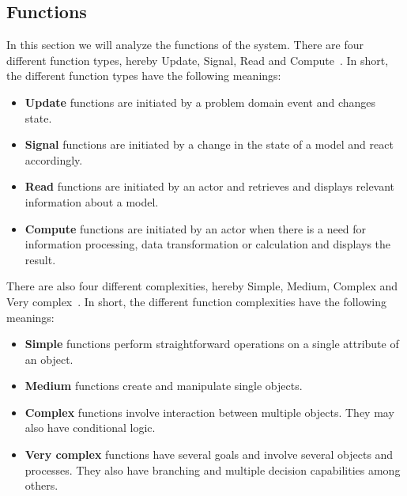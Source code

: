 \subsection{Functions}\label{subsec:functions}

In this section we will analyze the functions of the system.
There are four different function types, hereby Update, Signal, Read and Compute~\cite{mathiassen2018}.
In short, the different function types have the following meanings:

\begin{itemize}
    \item \textbf{Update} functions are initiated by a problem domain event and changes state.

    \item \textbf{Signal} functions are initiated by a change in the state of a model and react accordingly.

    \item \textbf{Read} functions are initiated by an actor and retrieves and displays relevant information about a
    model.

    \item \textbf{Compute} functions are initiated by an actor when there is a need for information processing, data
    transformation or calculation and displays the result.
\end{itemize}

There are also four different complexities, hereby Simple, Medium, Complex and Very complex~\cite{mathiassen2018}.
In short, the different function complexities have the following meanings:

\begin{itemize}
    \item \textbf{Simple} functions perform straightforward operations on a single attribute of an object.

    \item \textbf{Medium} functions create and manipulate single objects.

    \item \textbf{Complex} functions involve interaction between multiple objects.
    They may also have conditional logic.

    \item \textbf{Very complex} functions have several goals and involve several objects and processes.
    They also have branching and multiple decision capabilities among others.
\end{itemize}


